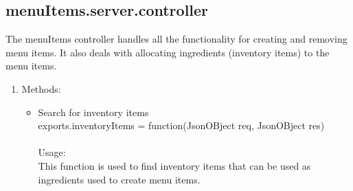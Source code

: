 \documentclass[a4paper,12pt]{report}
\begin{document}
\subsection{menuItems.server.controller}
 The menuItems controller handles all the functionality for creating and removing menu items. It also deals with allocating ingredients (inventory items) to the menu items.
\begin{enumerate}
\item Methods:
	\begin{itemize}
	\item Search for inventory items\\ exports.inventoryItems = function(JsonOBject req, JsonOBject res)\\ \\
  	Usage: \\
  	This function is used to find inventory items that can be used as ingredients used to create menu items.
	

\end{itemize}
\end{enumerate}
\end{document}
